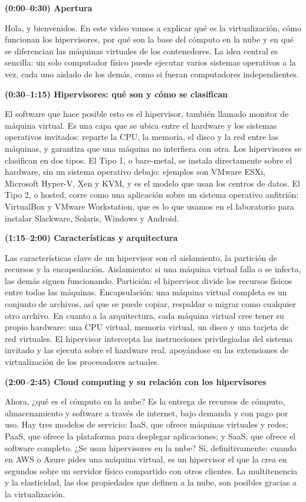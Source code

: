 \documentclass[11pt,a4paper]{report}
\begin{document}
\textbf{(0:00--0:30) Apertura}

Hola, y bienvenidos. En este video vamos a explicar qué es la virtualización, cómo funcionan los hipervisores, por qué son la base del cómputo en la nube y en qué se diferencian las máquinas virtuales de los contenedores. La idea central es sencilla: un solo computador físico puede ejecutar varios sistemas operativos a la vez, cada uno aislado de los demás, como si fueran computadores independientes.

\textbf{(0:30--1:15) Hipervisores: qué son y cómo se clasifican}

El software que hace posible esto es el hipervisor, también llamado monitor de máquina virtual. Es una capa que se ubica entre el hardware y los sistemas operativos invitados: reparte la CPU, la memoria, el disco y la red entre las máquinas, y garantiza que una máquina no interfiera con otra. Los hipervisores se clasifican en dos tipos. El Tipo 1, o bare-metal, se instala directamente sobre el hardware, sin un sistema operativo debajo: ejemplos son VMware ESXi, Microsoft Hyper-V, Xen y KVM, y es el modelo que usan los centros de datos. El Tipo 2, o hosted, corre como una aplicación sobre un sistema operativo anfitrión: VirtualBox y VMware Workstation, que es lo que usamos en el laboratorio para instalar Slackware, Solaris, Windows y Android.

\textbf{(1:15--2:00) Características y arquitectura}

Las características clave de un hipervisor son el aislamiento, la partición de recursos y la encapsulación. Aislamiento: si una máquina virtual falla o se infecta, las demás siguen funcionando. Partición: el hipervisor divide los recursos físicos entre todas las máquinas. Encapsulación: una máquina virtual completa es un conjunto de archivos, así que se puede copiar, respaldar o migrar como cualquier otro archivo. En cuanto a la arquitectura, cada máquina virtual cree tener su propio hardware: una CPU virtual, memoria virtual, un disco y una tarjeta de red virtuales. El hipervisor intercepta las instrucciones privilegiadas del sistema invitado y las ejecuta sobre el hardware real, apoyándose en las extensiones de virtualización de los procesadores actuales.

\textbf{(2:00--2:45) Cloud computing y su relación con los hipervisores}

Ahora, ¿qué es el cómputo en la nube? Es la entrega de recursos de cómputo, almacenamiento y software a través de internet, bajo demanda y con pago por uso. Hay tres modelos de servicio: IaaS, que ofrece máquinas virtuales y redes; PaaS, que ofrece la plataforma para desplegar aplicaciones; y SaaS, que ofrece el software completo. ¿Se usan hipervisores en la nube? Sí, definitivamente: cuando en AWS o Azure pides una máquina virtual, es un hipervisor el que la crea en segundos sobre un servidor físico compartido con otros clientes. La multitenencia y la elasticidad, las dos propiedades que definen a la nube, son posibles gracias a la virtualización.
\end{document}
